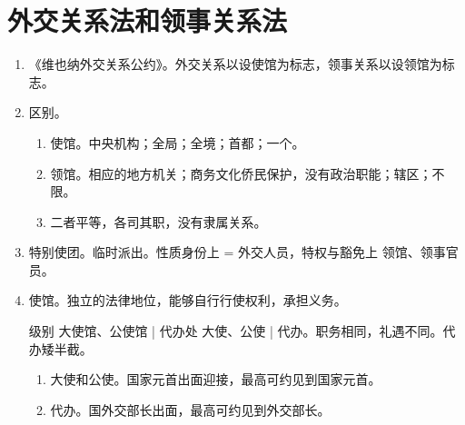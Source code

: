 \section{外交关系法和领事关系法}
\begin{enumerate}
  \item 《维也纳外交关系公约》。外交关系以设使馆为标志，领事关系以设领馆为标志。
  \item 区别。
        \begin{enumerate}
          \item 使馆。中央机构；全局；全境；首都；一个。
          \item 领馆。相应的地方机关；商务文化侨民保护，没有政治职能；辖区；不限。
          \item 二者平等，各司其职，没有隶属关系。
        \end{enumerate}
  \item 特别使团。临时派出。性质身份上 = 外交人员，特权与豁免上 \ydy 领馆、领事官员。
  \item 使馆。独立的法律地位，能够自行行使权利，承担义务。
        \begin{kk}{级别}
          大使馆、公使馆 | 代办处 \yjt 大使、公使 | 代办。职务相同，礼遇不同。代办矮半截。
          \begin{enumerate}
            \item 大使和公使。国家元首出面迎接，最高可约见到国家元首。
            \item 代办。国外交部长出面，最高可约见到外交部长。
          \end{enumerate}
        \end{kk}


\end{enumerate}
